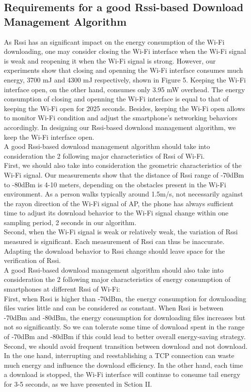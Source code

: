 \documentclass[journal]{IEEEtran}
\begin{document}
\subsection{Requirements for a good Rssi-based Download Management Algorithm}
As Rssi has an significant impact on the energy consumption of the Wi-Fi downloading, one may consider closing the Wi-Fi interface 
when the Wi-Fi signal is weak and reopening it when the Wi-Fi signal is strong. However, our experiments show that 
closing and openning the Wi-Fi interface consumes much energy,  3700 mJ and 4300 mJ respectively, shown in Figure 5. 
Keeping the Wi-Fi interface open, on the other hand, consumes only 3.95 mW overhead. 
The energy consumption of closing and openning the Wi-Fi interface is equal to that of keeping the Wi-Fi open for 2025 seconds.
Besides, keeping the Wi-Fi open allows to monitor Wi-Fi condition and adjust the smartphone's networking behaviors accordingly.
In designing our Rssi-based download management algorithm, we keep the Wi-Fi interface open.
\\
\indent
A good Rssi-based download management algorithm should take into consideration the 2 following major characteristics of Rssi of Wi-Fi. 
\\
\indent
First, we should also take into consideration the geometric characteristics of the Wi-Fi signal. Our measurements show that the distance 
of Rssi range of -70dBm to -80dBm is 4-10 meters, depending on the obstacles present in the Wi-Fi environment. 
As a person walks typically around 1.5m/s, not necessarily against the rayon direction 
of the Wi-Fi signal of AP, the phone has always sufficient time to adjust its download behavior to the Wi-Fi signal change within one sampling period, 
2 seconds in our algorithm.
\\
\indent
Second, when the Wi-Fi signal is weak or relatively weak, the variation of Rssi measured is significant. Each measurement of Rssi can thus be inaccurate.
Adapting the download behavior to Rssi change should leave space for the verification of Rssi.
\\
\indent
A good Rssi-based download management algorithm should also take into consideration the 2 following major characteristics of energy consumption of smartphones at different Rssi of Wi-Fi:
\\
\indent
First, when Rssi is higher than -70dBm, the 
energy consumption for downloading files varies little and can be considered as constant. 
When Rssi is between -70dBm and -80dBm, the energy consumption for downloading files 
increases but not so significantly. So we can tolerate some time of download spent in the range of -70dBm and -80dBm if this could lead 
to better overall energy-saving strategy.
\\
\indent
Second, we should avoid frequent transition between download and not download. In the one hand, interrupting and 
reestablishing a TCP connection can waste much energy and influence the download
efficiency. In the other hand, each time a download is stopped, the Wi-Fi interface will continue to consume tail energy for 3-5 seconds, as we have presented in Sction II. 
\end{document}
